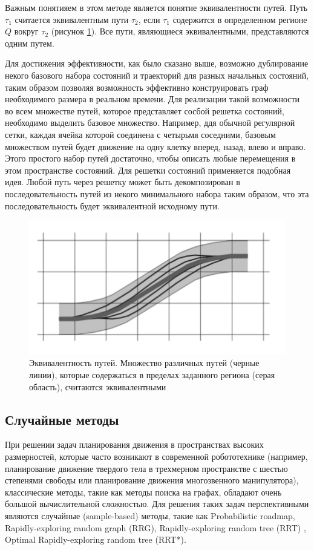 Важным понятияем в этом методе является понятие эквивалентности путей. Путь $\tau_1$ считается эквивалентным пути
$\tau_2$, если $\tau_1$ содержится в определенном регионе $Q$ вокруг $\tau_2$ (рисунок \ref{img:lattice_path_eq}).
Все пути, являющиеся эквивалентными, представляются одним путем.

Для достижения эффективности, как было сказано выше, возможно дублирование некого базового набора состояний и траекторий
для разных начальных состояний, таким образом позволяя возможность эффективно конструировать граф необходимого размера
в реальном времени. Для реализации такой возможности во всем множестве путей, которое представляет сосбой решетка состояний,
необходимо выделить базовое множество. Например, ддя обычной регулярной сетки, каждая ячейка которой соединена с
четырьмя соседними, базовым множеством путей будет движение на одну клетку вперед, назад, влево и вправо. Этого простого
набор путей достаточно, чтобы описать любые перемещения в этом пространстве состояний. Для решетки состояний применяется
подобная идея. Любой путь через решетку может быть декомпозирован в последовательность путей из некого минимального
набора таким образом, что эта последовательность будет эквивалентной исходному пути.

\begin{figure}[h]
    \centering
    \includegraphics[]{images/lattice_path_eq}
    \caption{Эквивалентность путей. Множество различных путей (черные линии), которые содержаться в пределах заданного
             региона (серая область), считаются эквивалентными}
    \label{img:lattice_path_eq}
\end{figure}

\subsection{Случайные методы}

При решении задач планирования движения в пространствах высоких размерностей, которые часто возникают в современной
робототехнике (например, планирование движение твердого тела в трехмерном пространстве с шестью степенями свободы или
планирование движения многозвенного манипулятора), классические методы, такие как методы поиска на графах, обладают
очень большой вычислительной сложностью. Для решения таких задач перспективными являются случайные (sample-based) методы,
такие как Probabilistic roadmap, Rapidly-exploring random graph (RRG), Rapidly-exploring random tree (RRT)
\cite{motion_planning_rrt}, Optimal Rapidly-exploring random tree (RRT*)\cite{motion_planning_rrt_star}.

